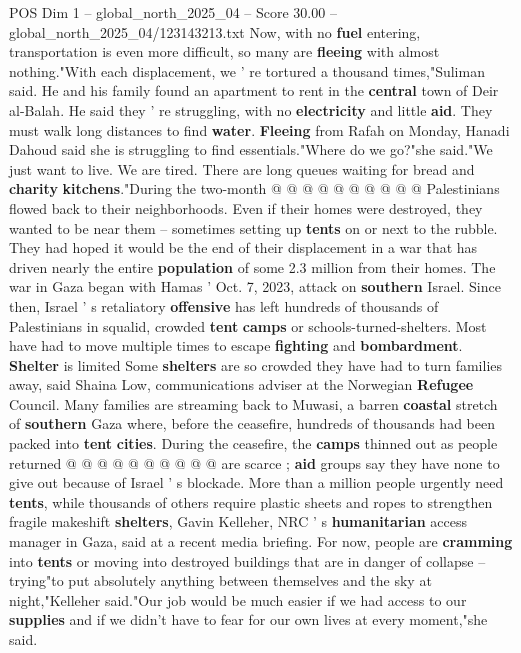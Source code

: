 \begin{textsample}{POS Dim 1 – global\_north\_2025\_04 – Score 30.00 – global\_north\_2025\_04/123143213.txt}
Now, with no \textbf{fuel} entering, transportation is even more difficult, so many are \textbf{fleeing} with almost nothing."With each displacement, we ' re tortured a thousand times,"Suliman said.
He and his family found an apartment to rent in the \textbf{central} town of Deir al-Balah.
He said they ' re struggling, with no \textbf{electricity} and little \textbf{aid}.
They must walk long distances to find \textbf{water}. \textbf{Fleeing} from Rafah on Monday, Hanadi Dahoud said she is struggling to find essentials."Where do we go?"she said."We just want to live.
We are tired.
There are long queues waiting for bread and \textbf{charity} \textbf{kitchens}."During the two-month @ @ @ @ @ @ @ @ @ @ Palestinians flowed back to their neighborhoods.
Even if their homes were destroyed, they wanted to be near them -- sometimes setting up \textbf{tents} on or next to the rubble.
They had hoped it would be the end of their displacement in a war that has driven nearly the entire \textbf{population} of some 2.3 million from their homes.
The war in Gaza began with Hamas ' Oct. 7, 2023, attack on \textbf{southern} Israel.
Since then, Israel ' s retaliatory \textbf{offensive} has left hundreds of thousands of Palestinians in squalid, crowded \textbf{tent} \textbf{camps} or schools-turned-shelters.
Most have had to move multiple times to escape \textbf{fighting} and \textbf{bombardment}. \textbf{Shelter} is limited Some \textbf{shelters} are so crowded they have had to turn families away, said Shaina Low, communications adviser at the Norwegian \textbf{Refugee} Council.
Many families are streaming back to Muwasi, a barren \textbf{coastal} stretch of \textbf{southern} Gaza where, before the ceasefire, hundreds of thousands had been packed into \textbf{tent} \textbf{cities}.
During the ceasefire, the \textbf{camps} thinned out as people returned @ @ @ @ @ @ @ @ @ @ are scarce ; \textbf{aid} groups say they have none to give out because of Israel ' s blockade.
More than a million people urgently need \textbf{tents}, while thousands of others require plastic sheets and ropes to strengthen fragile makeshift \textbf{shelters}, Gavin Kelleher, NRC ' s \textbf{humanitarian} access manager in Gaza, said at a recent media briefing.
For now, people are \textbf{cramming} into \textbf{tents} or moving into destroyed buildings that are in danger of collapse -- trying"to put absolutely anything between themselves and the sky at night,"Kelleher said."Our job would be much easier if we had access to our \textbf{supplies} and if we didn't have to fear for our own lives at every moment,"she said.

\end{textsample}
